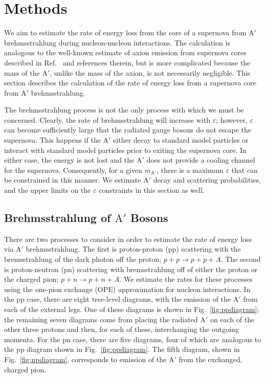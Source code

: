 \documentclass[nofootinbib,prd,superscriptaddress,twocolumn]{revtex4}
\newcommand{\Aprime}{\mathrm{A}'}
\begin{document}
\section{Methods}
\label{section:computational}
	
We aim to estimate the rate of energy loss from the core of a supernova from $\Aprime$ brehmsstrahlung 
during nucleon-nucleon interactions. The calculation is analogous to the well-known estimate of axion 
emission from supernova cores described in Ref.~\cite{raffelt96_book} and references therein, but is 
more complicated because the mass of the $\Aprime$, unlike the mass of the axion, is not necessarily 
negligible. This section describes the calculation of the rate of energy loss from a supernova core 
from $\Aprime$ brehmsstrahlung. 

The brehmsstrahlung process is not the only process with which we must be concerned. Clearly, the rate of 
brehmsstrahlung will increase with $\varepsilon$; however, $\varepsilon$ can become sufficiently large 
that the radiated gauge bosons do not escape the supernova. This happens if the $\Aprime$ either decay to 
standard model particles or interact with standard model particles prior to exiting the supernova core. 
In either case, the energy is not lost and the $\Aprime$ does not provide a cooling channel for the supernova. 
Consequently, for a given $m_{\Aprime}$, there is a maximum $\varepsilon$ that can be constrained in this 
manner. We estimate $\Aprime$ decay and scattering probabilities, and the upper limits on the $\varepsilon$ 
constraints in this section as well. 

	
\subsection{Brehmsstrahlung of $\Aprime$ Bosons}


There are two processes to consider in order to estimate the rate of energy loss via $\Aprime$ brehmsstrahlung. The first is  
proton-proton (pp) scattering with the bremsstrahlung of the dark photon off the proton; $p+p \rightarrow p+p+A$. The 
second is proton-neutron (pn) scattering with bremsstrahlung off of either the proton or the charged pion; 
$p+n \rightarrow p+n+A$. We estimate the rates for these processes using the one-pion exchange (OPE) 
approximation for nucleon interactions. In the pp case, there are eight tree-level diagrams, 
with the emission of the $\Aprime$ from each of the external legs. One of these diagrams is shown 
in Fig.~\ref{fig:ppdiagram}; the remaining seven diagrams come from placing the radiated $\Aprime$ 
on each of the other three protons and then, for each of these, interchanging the outgoing momenta. 
For the pn case, there are five diagrams, four of which are analogous to the pp diagram shown in 
Fig.~\ref{fig:ppdiagram}. The fifth diagram, shown in Fig.~\ref{fig:npdiagram}, corresponds to 
emission of the $\Aprime$ from the exchanged, charged pion.
\end{document}
